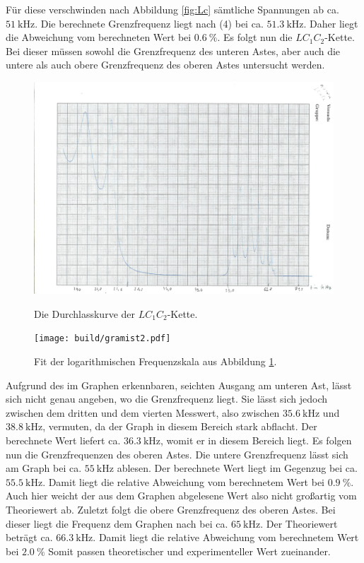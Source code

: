 	 Für diese verschwinden nach Abbildung \ref{fig:Lc} sämtliche Spannungen ab ca.
	  $\SI{51}{\kilo\hertz}$. Die berechnete Grenzfrequenz liegt nach (4) bei
		 ca. $\SI{51,3}{\kilo\hertz}$. Daher liegt die Abweichung vom berechneten Wert bei $\SI{0.6}{\percent}$. Es folgt nun die $LC_1C_2$-Kette. Bei dieser müssen
			 sowohl die Grenzfrequenz des unteren Astes, aber auch die untere als auch obere Grenzfrequenz des
			  oberen Astes untersucht werden.

        \begin{figure}
         \centering
         \caption{Die Durchlasskurve der $LC_1C_2$-Kette.}
         \includegraphics[width=\linewidth-70pt,height=\textheight-70pt,keepaspectratio]{content/Scans/LC1C2.png}
         \label{fig:Lc1c2}
        \end{figure}
        \begin{figure}
        	\centering
        	\caption{Fit der logarithmischen Frequenzskala aus Abbildung \ref{fig:Lc1c2}.}
        	\texttt{[image: build/gramist2.pdf]}
        	\label{fig:Lc1c2Mist}
        \end{figure}

         Aufgrund des im Graphen erkennbaren, seichten
				Ausgang am unteren Ast, lässt sich nicht genau angeben, wo die
				 Grenzfrequenz liegt. Sie lässt sich jedoch zwischen dem dritten
				  und dem vierten Messwert, also zwischen $\SI{35,6}{\kilo\hertz}$ und
					$\SI{38,8}{\kilo\hertz}$, vermuten, da der Graph in diesem Bereich
					 stark abflacht. Der berechnete Wert liefert ca. $\SI{36,3}{\kilo\hertz}$,
					  womit er in diesem Bereich liegt.
						 Es folgen nun die Grenzfrequenzen des oberen Astes. Die
						  untere Grenzfrequenz lässt sich am Graph bei ca. $\SI{55}{\kilo\hertz}$
							ablesen. Der berechnete Wert liegt im Gegenzug bei
							 ca. $\SI{55,5}{\kilo\hertz}$. Damit liegt die relative Abweichung vom berechnetem Wert bei $\SI{0.9}{\percent}$. Auch hier weicht der aus dem Graphen abgelesene Wert also nicht
							 großartig vom Theoriewert ab. Zuletzt folgt die obere Grenzfrequenz
							 des oberen Astes. Bei dieser liegt die Frequenz dem Graphen nach bei ca.
							  $\SI{65}{\kilo\hertz}$. Der Theoriewert beträgt ca. $\SI{66,3}{\kilo\hertz}$. Damit liegt die relative Abweichung vom berechnetem Wert bei $\SI{2.0}{\percent}$ 
							Somit passen theoretischer und experimenteller Wert zueinander.


